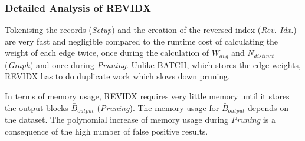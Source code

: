 \documentclass[a4paper,12pt]{article}
\begin{document}
\begin{center}
\end{center}

\newpage
\subsubsection{Detailed Analysis of REVIDX}
Tokenising the records (\emph{Setup}) and the creation of the reversed index (\emph{Rev. Idx.}) are very fast and negligible compared to the runtime cost of calculating the weight of each edge twice, once during the calculation of $W_{avg}$ and $N_{distinct}$ (\emph{Graph}) and once during \emph{Pruning}. Unlike BATCH, which stores the edge weights, REVIDX has to do duplicate work which slows down pruning. \\

\begin{center}
\end{center}

In terms of memory usage, REVIDX requires very little memory until it stores the output blocks $\bar B_{output}$ (\emph{Pruning}). The memory usage for $\bar B_{output}$ depends on the dataset. The polynomial increase of memory usage during \emph{Pruning} is a consequence of the high number of false positive results.
\end{document}
